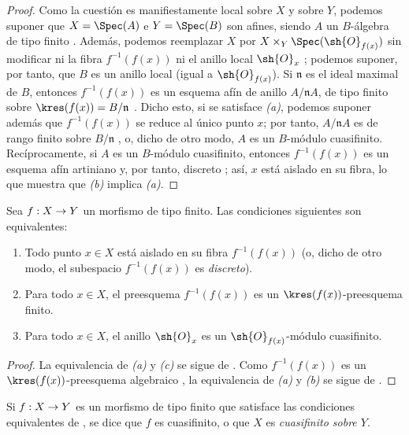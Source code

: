 \documentclass[oneside,10pt]{amsart}
\makeatletter
\newcommand{\ega@arrow}[2]{\mathchoice{#1}{#2}{#2}{#2}}
\renewcommand{\to}{\ega@arrow{\longrightarrow}{\rightarrow}}
\let\EGAOriginalLabel\label
\renewcommand{\label}[1]{\phantomsection\EGAOriginalLabel{#1}}
\makeatother
\begin{document}
\begin{proof}
Como la cuestión es manifiestamente local sobre $X$ y sobre $Y$, podemos suponer que $X=\Spec(A)$ e $Y=\Spec(B)$ son afines, siendo $A$ un $B$-álgebra de tipo finito .
Además, podemos reemplazar $X$ por $X\times_Y\Spec(\sh{O}_{f(x)})$ sin modificar ni la fibra $f^{-1}(f(x))$ ni el anillo local $\sh{O}_x$ ;
podemos suponer, por tanto, que $B$ es un anillo local (igual a $\sh{O}_{f(x)}$).
Si $\mathfrak{n}$ es el ideal maximal de $B$, entonces $f^{-1}(f(x))$ es un esquema afín de anillo $A/\mathfrak{n}A$, de tipo finito sobre $\kres(f(x))=B/\mathfrak{n}$ .
Dicho esto, si se satisface \emph{(a)}, podemos suponer además que $f^{-1}(f(x))$ se reduce al único punto $x$;
por tanto, $A/\mathfrak{n}A$ es de rango finito sobre $B/\mathfrak{n}$ , o, dicho de otro modo, $A$ es un $B$-módulo cuasifinito.
Recíprocamente, si $A$ es un $B$-módulo cuasifinito, entonces $f^{-1}(f(x))$ es un esquema afín artiniano y, por tanto, discreto ;
así, $x$ está aislado en su fibra, lo que muestra que \emph{(b)} implica \emph{(a)}.
\end{proof}

\begin{corollary}[6.2.2]
\label{II.6.2.2}
Sea $f:X\to Y$ un morfismo de tipo finito.
Las condiciones siguientes son equivalentes:
\begin{enumerate}
  \item[{\rm(a)}] Todo punto $x\in X$ está aislado en su fibra $f^{-1}(f(x))$ \textup{(o, dicho de otro modo, el subespacio $f^{-1}(f(x))$ es \emph{discreto})}.
  \item[{\rm(b)}] Para todo $x\in X$, el preesquema $f^{-1}(f(x))$ es un $\kres(f(x))$-preesquema finito.
  \item[{\rm(c)}] Para todo $x\in X$, el anillo $\sh{O}_x$ es un $\sh{O}_{f(x)}$-módulo cuasifinito.
\end{enumerate}
\end{corollary}

\begin{proof}
La equivalencia de \emph{(a)} y \emph{(c)} se sigue de .
Como $f^{-1}(f(x))$ es un $\kres(f(x))$-preesquema algebraico , la equivalencia de \emph{(a)} y \emph{(b)} se sigue de .
\end{proof}

\begin{definition}[6.2.3]
\label{II.6.2.3}
Si $f:X\to Y$ es un morfismo de tipo finito que satisface las condiciones equivalentes de \textup{}, se dice que $f$ es cuasifinito, o que $X$ es \emph{cuasifinito sobre $Y$}.
\end{definition}
\end{document}
